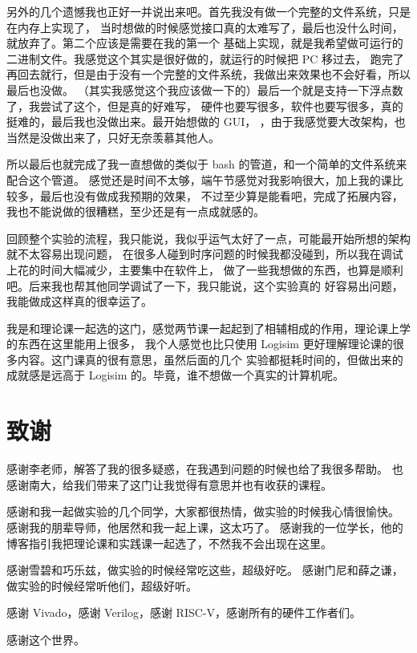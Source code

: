 \documentclass[12pt, a4paper]{ctexart}
\begin{document}
另外的几个遗憾我也正好一并说出来吧。首先我没有做一个完整的文件系统，只是在内存上实现了，
当时想做的时候感觉接口真的太难写了，最后也没什么时间，就放弃了。第二个应该是需要在我的第一个
基础上实现，就是我希望做可运行的二进制文件。我感觉这个其实是很好做的，就运行的时候把 PC 移过去，
跑完了再回去就行，但是由于没有一个完整的文件系统，我做出来效果也不会好看，所以最后也没做。
（其实我感觉这个我应该做一下的）最后一个就是支持一下浮点数了，我尝试了这个，但是真的好难写，
硬件也要写很多，软件也要写很多，真的挺难的，最后我也没做出来。最开始想做的 GUI，
，由于我感觉要大改架构，也当然是没做出来了，只好无奈羡慕其他人。

所以最后也就完成了我一直想做的类似于 bash 的管道，和一个简单的文件系统来配合这个管道。
感觉还是时间不太够，端午节感觉对我影响很大，加上我的课比较多，最后也没有做成我预期的效果，
不过至少算是能看吧，完成了拓展内容，我也不能说做的很糟糕，至少还是有一点成就感的。

回顾整个实验的流程，我只能说，我似乎运气太好了一点，可能最开始所想的架构就不太容易出现问题，
在很多人碰到时序问题的时候我都没碰到，所以我在调试上花的时间大幅减少，主要集中在软件上，
做了一些我想做的东西，也算是顺利吧。后来我也帮其他同学调试了一下，我只能说，这个实验真的
好容易出问题，我能做成这样真的很幸运了。

我是和理论课一起选的这门，感觉两节课一起起到了相辅相成的作用，理论课上学的东西在这里能用上很多，
我个人感觉也比只使用 Logisim 更好理解理论课的很多内容。这门课真的很有意思，虽然后面的几个
实验都挺耗时间的，但做出来的成就感是远高于 Logisim 的。毕竟，谁不想做一个真实的计算机呢。

\section{致谢}

感谢李老师，解答了我的很多疑惑，在我遇到问题的时候也给了我很多帮助。
也感谢南大，给我们带来了这门让我觉得有意思并也有收获的课程。

感谢和我一起做实验的几个同学，大家都很热情，做实验的时候我心情很愉快。
感谢我的朋辈导师，他居然和我一起上课，这太巧了。
感谢我的一位学长，他的博客指引我把理论课和实践课一起选了，不然我不会出现在这里。

感谢雪碧和巧乐兹，做实验的时候经常吃这些，超级好吃。
感谢门尼和薛之谦，做实验的时候经常听他们，超级好听。

感谢 Vivado，感谢 Verilog，感谢 RISC-V，感谢所有的硬件工作者们。

感谢这个世界。
\end{document}
